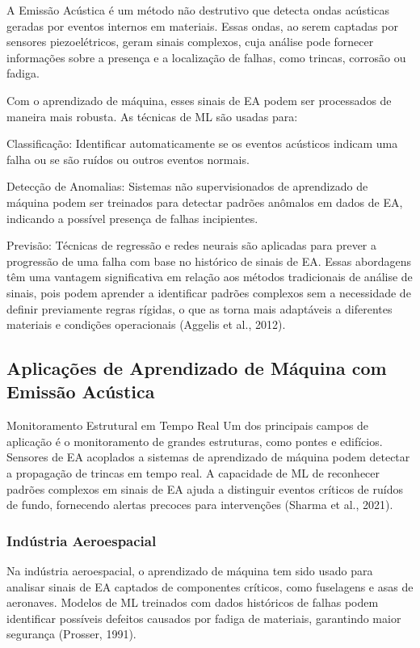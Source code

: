 A Emissão Acústica é um método não destrutivo que detecta ondas acústicas geradas por eventos internos em materiais. Essas ondas, ao serem captadas por sensores piezoelétricos, geram sinais complexos, cuja análise pode fornecer informações sobre a presença e a localização de falhas, como trincas, corrosão ou fadiga.

Com o aprendizado de máquina, esses sinais de EA podem ser processados de maneira mais robusta. As técnicas de ML são usadas para:


Classificação: Identificar automaticamente se os eventos acústicos indicam uma falha ou se são ruídos ou outros eventos normais.


Detecção de Anomalias: Sistemas não supervisionados de aprendizado de máquina podem ser treinados para detectar padrões anômalos em dados de EA, indicando a possível presença de falhas incipientes.


Previsão: Técnicas de regressão e redes neurais são aplicadas para prever a progressão de uma falha com base no histórico de sinais de EA.
Essas abordagens têm uma vantagem significativa em relação aos métodos tradicionais de análise de sinais, pois podem aprender a identificar padrões complexos sem a necessidade de definir previamente regras rígidas, o que as torna mais adaptáveis a diferentes materiais e condições operacionais (Aggelis et al., 2012).

\subsection{Aplicações de Aprendizado de Máquina com Emissão Acústica}

Monitoramento Estrutural em Tempo Real
Um dos principais campos de aplicação é o monitoramento de grandes estruturas, como pontes e edifícios. Sensores de EA acoplados a sistemas de aprendizado de máquina podem detectar a propagação de trincas em tempo real. A capacidade de ML de reconhecer padrões complexos em sinais de EA ajuda a distinguir eventos críticos de ruídos de fundo, fornecendo alertas precoces para intervenções (Sharma et al., 2021).

\subsubsection{Indústria Aeroespacial}

Na indústria aeroespacial, o aprendizado de máquina tem sido usado para analisar sinais de EA captados de componentes críticos, como fuselagens e asas de aeronaves. Modelos de ML treinados com dados históricos de falhas podem identificar possíveis defeitos causados por fadiga de materiais, garantindo maior segurança (Prosser, 1991).

